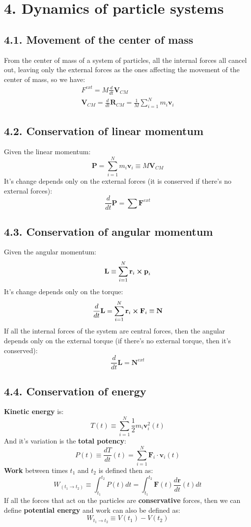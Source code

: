 \documentclass[a4paper,landscape,10pt]{cheatsheet}
\begin{document}
\section*{4. Dynamics of particle systems}
\subsection*{4.1. Movement of the center of mass}
From the center of mass of a system of particles, all the internal forces all cancel out, leaving only the external forces as the ones affecting
the movement of the center of mass, so we have:
\begin{gather*}
  F^{ext} = M \frac{d}{dt}\textbf{V}_{CM} \\
  \textbf{V}_{CM} = \frac{d}{dt}\textbf{R}_{CM} = \frac{1}{M}\sum_{i=1}^{N}m_i\textbf{v}_i
\end{gather*}
\subsection*{4.2. Conservation of linear momentum}
Given the linear momentum:
$$
\textbf{P}=\sum_{i=1}^{N}m_i\textbf{v}_i \equiv M\textbf{V}_{CM}
$$
It's change depends only on the external forces (it is conserved if there's no external forces):
$$
\frac{d}{dt}\textbf{P}=\sum\textbf{F}^{ext}
$$
\subsection*{4.3. Conservation of angular momentum}
Given the angular momentum:
$$
\textbf{L} \equiv \sum_{i=1}^{N}\textbf{r}_i\cross\textbf{p}_i
$$
It's change depends only on the torque:
$$
\frac{d}{dt}\textbf{L}=\sum_{i=1}^{N}\textbf{r}_i\cross\textbf{F}_i\equiv\textbf{N}
$$
If all the internal forces of the system are central forces, then the angular depends only on the external torque (if
there's no external torque, then it's conserved):
$$
\frac{d}{dt}\textbf{L}=\textbf{N}^{ext}
$$
\subsection*{4.4. Conservation of energy}
\textbf{Kinetic energy} is:
$$
T(t)\equiv\sum_{i=1}^{N}\frac{1}{2}m_i\textbf{v}^2_i(t)
$$
And it's variation is the \textbf{total potency}:
$$
P(t) \equiv \frac{dT}{dt}(t) = \sum_{i=1}^{N}\textbf{F}_i\cdot\textbf{v}_i(t)
$$
\textbf{Work} between times $t_1$ and $t_2$ is defined then as:
$$
W_(t_1\rightarrow t_2) \equiv \int_{t_1}^{t_2}P(t)dt = \int_{t_1}^{t_2}\textbf{F}(t)\frac{d\textbf{r}}{dt}(t)dt
$$
If all the forces that act on the particles are \textbf{conservative} forces, then we can define \textbf{potential energy} and work can also be defined as:
$$
W_{t_1\rightarrow t_2} \equiv V(t_1) - V(t_2)
$$
\end{document}
